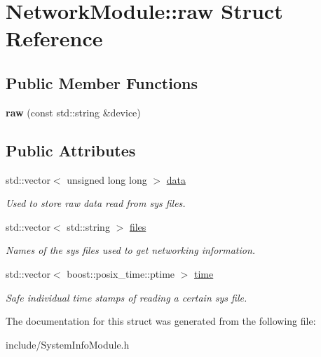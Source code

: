 \hypertarget{structNetworkModule_1_1raw}{}\section{Network\+Module\+:\+:raw Struct Reference}
\label{structNetworkModule_1_1raw}
\subsection*{Public Member Functions}
\begin{DoxyCompactItemize}
\item 
{\bfseries raw} (const std\+::string \&device)\hypertarget{structNetworkModule_1_1raw_a0c4f55a410f3401c632dd1f3b56c1e42}{}\label{structNetworkModule_1_1raw_a0c4f55a410f3401c632dd1f3b56c1e42}

\end{DoxyCompactItemize}
\subsection*{Public Attributes}
\begin{DoxyCompactItemize}
\item 
std\+::vector$<$ unsigned long long $>$ \hyperlink{structNetworkModule_1_1raw_ae45615ddaebe769ab5d12687cf06c24e}{data}\hypertarget{structNetworkModule_1_1raw_ae45615ddaebe769ab5d12687cf06c24e}{}\label{structNetworkModule_1_1raw_ae45615ddaebe769ab5d12687cf06c24e}

\begin{DoxyCompactList}\small\item\em Used to store raw data read from sys files. \end{DoxyCompactList}\item 
std\+::vector$<$ std\+::string $>$ \hyperlink{structNetworkModule_1_1raw_a1c6ba29222baea30b5ae3db2dd16af81}{files}\hypertarget{structNetworkModule_1_1raw_a1c6ba29222baea30b5ae3db2dd16af81}{}\label{structNetworkModule_1_1raw_a1c6ba29222baea30b5ae3db2dd16af81}

\begin{DoxyCompactList}\small\item\em Names of the sys files used to get networking information. \end{DoxyCompactList}\item 
std\+::vector$<$ boost\+::posix\+\_\+time\+::ptime $>$ \hyperlink{structNetworkModule_1_1raw_a8ac9cd0635f21d4eba09d38a19bccb9f}{time}\hypertarget{structNetworkModule_1_1raw_a8ac9cd0635f21d4eba09d38a19bccb9f}{}\label{structNetworkModule_1_1raw_a8ac9cd0635f21d4eba09d38a19bccb9f}

\begin{DoxyCompactList}\small\item\em Safe individual time stamps of reading a certain sys file. \end{DoxyCompactList}\end{DoxyCompactItemize}


The documentation for this struct was generated from the following file\+:\begin{DoxyCompactItemize}
\item 
include/System\+Info\+Module.\+h\end{DoxyCompactItemize}
